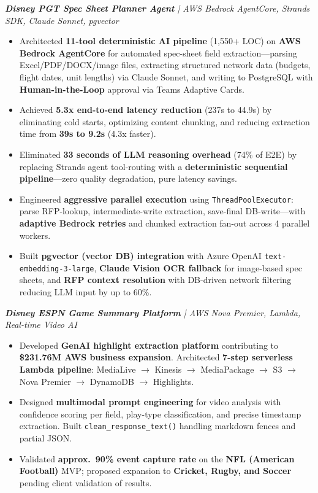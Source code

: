 \documentclass[letterpaper,10pt]{article}
\newcommand{\resumeItem}[1]{
  \item\small{
    {#1 \vspace{-2pt}}
  }
}
\newcommand{\resumeItemListStart}{\begin{itemize}}
\newcommand{\resumeItemListEnd}{\end{itemize}\vspace{-5pt}}
\begin{document}
      \vspace{12pt}
      \textit{\small\textbf{Disney PGT Spec Sheet Planner Agent} | AWS Bedrock AgentCore, Strands SDK, Claude Sonnet, pgvector}
      \resumeItemListStart
        \resumeItem{Architected \textbf{11-tool deterministic AI pipeline} (1,550+ LOC) on \textbf{AWS Bedrock AgentCore} for automated spec-sheet field extraction---parsing Excel/PDF/DOCX/image files, extracting structured network data (budgets, flight dates, unit lengths) via Claude Sonnet, and writing to PostgreSQL with \textbf{Human-in-the-Loop} approval via Teams Adaptive Cards.}
        \resumeItem{Achieved \textbf{5.3x end-to-end latency reduction} (237s to 44.9s) by eliminating cold starts, optimizing content chunking, and reducing extraction time from \textbf{39s to 9.2s} (4.3x faster).}
        \resumeItem{Eliminated \textbf{33 seconds of LLM reasoning overhead} (74\% of E2E) by replacing Strands agent tool-routing with a \textbf{deterministic sequential pipeline}---zero quality degradation, pure latency savings.}
        \resumeItem{Engineered \textbf{aggressive parallel execution} using \texttt{ThreadPoolExecutor}: parse \textbar\textbar{} RFP-lookup, intermediate-write \textbar\textbar{} extraction, save-final \textbar\textbar{} DB-write---with \textbf{adaptive Bedrock retries} and chunked extraction fan-out across 4 parallel workers.}
        \resumeItem{Built \textbf{pgvector (vector DB) integration} with Azure OpenAI \texttt{text-embedding-3-large}, \textbf{Claude Vision OCR fallback} for image-based spec sheets, and \textbf{RFP context resolution} with DB-driven network filtering reducing LLM input by up to 60\%.}
      \resumeItemListEnd

      \vspace{12pt}
      \textit{\small\textbf{Disney ESPN Game Summary Platform} | AWS Nova Premier, Lambda, Real-time Video AI}
      \resumeItemListStart
        \resumeItem{Developed \textbf{GenAI highlight extraction platform} contributing to \textbf{\$231.76M AWS business expansion}. Architected \textbf{7-step serverless Lambda pipeline}: MediaLive $\rightarrow$ Kinesis $\rightarrow$ MediaPackage $\rightarrow$ S3 $\rightarrow$ Nova Premier $\rightarrow$ DynamoDB $\rightarrow$ Highlights.}
        \resumeItem{Designed \textbf{multimodal prompt engineering} for video analysis with confidence scoring per field, play-type classification, and precise timestamp extraction. Built \texttt{clean\_response\_text()} handling markdown fences and partial JSON.}
        \resumeItem{Validated \textbf{approx.\ 90\% event capture rate} on the \textbf{NFL (American Football)} MVP; proposed expansion to \textbf{Cricket, Rugby, and Soccer} pending client validation of results.}
      \resumeItemListEnd
\end{document}
